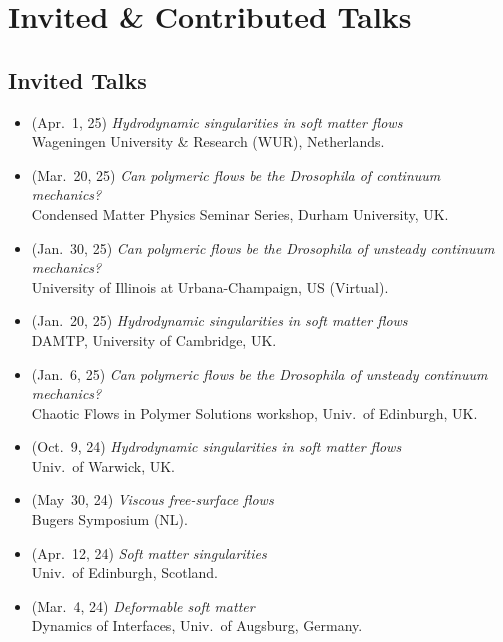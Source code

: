 \documentclass[10pt,a4paper,colorlinks,linkcolor=blue,urlcolor=blue,citecolor=blue]{moderncv}
\begin{document}
\section{Invited \& Contributed Talks}

\subsection{\faMicrophone\hspace{0.3em}Invited Talks}
\begin{itemize}[leftmargin=1.5em]
\item[\textbullet] (Apr.~1, 25) \emph{Hydrodynamic singularities in soft matter flows} \\
  Wageningen University \& Research (WUR), Netherlands.
\item[\textbullet] (Mar.~20, 25) \emph{Can polymeric flows be the Drosophila of continuum mechanics?} \\
  Condensed Matter Physics Seminar Series, Durham University, UK.
\item[\textbullet] (Jan.~30, 25) \emph{Can polymeric flows be the Drosophila of unsteady continuum mechanics?} \\
  University of Illinois at Urbana-Champaign, US (Virtual).
\item[\textbullet] (Jan.~20, 25) \emph{Hydrodynamic singularities in soft matter flows} \\
  DAMTP, University of Cambridge, UK.
\item[\textbullet] (Jan.~6, 25) \emph{Can polymeric flows be the Drosophila of unsteady continuum mechanics?}\\
  Chaotic Flows in Polymer Solutions workshop, Univ.~of Edinburgh, UK.
\item[\textbullet] (Oct.~9, 24) \emph{Hydrodynamic singularities in soft matter flows} \\
  Univ.~of Warwick, UK.
\item[\textbullet] (May~30, 24) \emph{Viscous free-surface flows} \\
  Bugers Symposium (NL).
\item[\textbullet] (Apr.~12, 24) \emph{Soft matter singularities} \\
  Univ.~of Edinburgh, Scotland.
\item[\textbullet] (Mar.~4, 24) \emph{Deformable soft matter} \\
  Dynamics of Interfaces, Univ.~of Augsburg, Germany.

\end{itemize}
\end{document}
